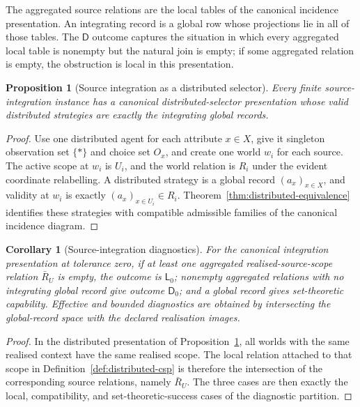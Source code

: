 \documentclass[11pt]{article}
\theoremstyle{plain}
\newtheorem{proposition}[theorem]{Proposition}
\newtheorem{corollary}[theorem]{Corollary}
\theoremstyle{definition}
\theoremstyle{remark}
\begin{document}
The aggregated source relations are the local tables of the canonical incidence
presentation. An integrating record is a global row whose projections lie in all
of those tables. The $\mathsf D$ outcome captures the situation in which every
aggregated local table is nonempty but the natural join is empty; if some
aggregated relation is empty, the obstruction is local in this presentation.

\begin{proposition}[Source integration as a distributed selector]
\label{prop:source-integration-distributed}
Every finite source-integration instance has a canonical distributed-selector
presentation whose valid distributed strategies are exactly the integrating
global records.
\end{proposition}

\begin{proof}
Use one distributed agent for each attribute $x\in X$, give it singleton
observation set $\{\ast\}$ and choice set $O_x$, and create one world $w_i$ for
each source. The active scope at $w_i$ is $U_i$, and the world relation is
$R_i$ under the evident coordinate relabelling. A distributed strategy is a
global record $(a_x)_{x\in X}$, and validity at $w_i$ is exactly
$(a_x)_{x\in U_i}\in R_i$. Theorem~\ref{thm:distributed-equivalence} identifies
these strategies with compatible admissible families of the canonical incidence
diagram.
\end{proof}

\begin{corollary}[Source-integration diagnostics]
\label{cor:source-integration-diagnostics}
For the canonical integration presentation at tolerance zero, if at least one
aggregated realised-source-scope relation $\bar R_U$ is empty, the outcome is
$\mathsf L_0$; nonempty aggregated relations with no integrating global record
give outcome
$\mathsf D_0$; and a global record gives set-theoretic capability. Effective and
bounded diagnostics are obtained by intersecting the global-record space with the
declared realisation images.
\end{corollary}

\begin{proof}
In the distributed presentation of Proposition~\ref{prop:source-integration-distributed},
all worlds with the same realised context have the same realised scope. The local
relation attached to that scope in Definition~\ref{def:distributed-csp} is
therefore the intersection of the corresponding source relations, namely
$\bar R_U$. The three cases are then exactly the local, compatibility, and
set-theoretic-success cases of the diagnostic partition.
\end{proof}
\end{document}
